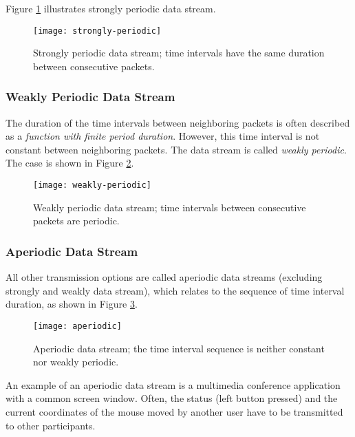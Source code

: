  Figure {\ref{fig:strongly-periodic}} illustrates strongly periodic data stream.

\begin{figure}[ht]
\centering
\texttt{[image: strongly-periodic]}
\caption[Strongly periodic data stream]{Strongly periodic data stream; time intervals have the same duration between consecutive packets.}\label{fig:strongly-periodic}
\end{figure}

\subsubsection{Weakly Periodic Data Stream}
The duration of the time intervals between neighboring packets is often described
as a \textit{function with finite period duration}. However, this time interval is not constant between neighboring packets. The data stream is called \textit{weakly periodic}. The case is shown in Figure {\ref{fig:weakly-periodic}}.

\begin{figure}[ht]
	\centering
	\texttt{[image: weakly-periodic]}
	\caption[Weakly periodic data stream]{Weakly periodic data stream; time intervals between consecutive packets are periodic.}\label{fig:weakly-periodic}
\end{figure}

\subsubsection{Aperiodic Data Stream}
All other transmission options are called aperiodic data streams  (excluding strongly and weakly data stream), which relates to
the sequence of time interval duration, as shown in Figure {\ref{fig:aperiodic}}.

\begin{figure}[hb!]
	\centering
	\texttt{[image: aperiodic]}
	\caption[Aperiodic data stream]{Aperiodic data stream; the time interval sequence is neither constant nor weakly periodic.}\label{fig:aperiodic}
\end{figure}

An example of an aperiodic data stream is a multimedia conference application
with a common screen window. Often, the status (left button pressed) and the current
coordinates of the mouse moved by another user have to be transmitted to other participants.

